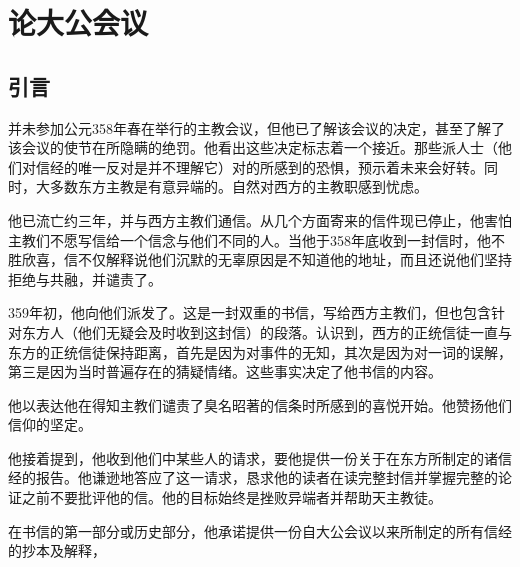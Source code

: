 
\chapter{论大公会议}



\section{引言}

并未参加公元358年春在举行的主教会议，但他已了解该会议的决定，甚至了解了该会议的使节在所隐瞒的绝罚。他看出这些决定标志着一个接近。那些派人士（他们对信经的唯一反对是并不理解它）对的所感到的恐惧，预示着未来会好转。同时，大多数东方主教是有意异端的。自然对西方的主教职感到忧虑。\par

他已流亡约三年，并与西方主教们通信。从几个方面寄来的信件现已停止，他害怕主教们不愿写信给一个信念与他们不同的人。当他于358年底收到一封信时，他不胜欣喜，信不仅解释说他们沉默的无辜原因是不知道他的地址，而且还说他们坚持拒绝与共融，并谴责了。\par

359年初，他向他们派发了。这是一封双重的书信，写给西方主教们，但也包含针对东方人（他们无疑会及时收到这封信）的段落。认识到，西方的正统信徒一直与东方的正统信徒保持距离，首先是因为对事件的无知，其次是因为对一词的误解，第三是因为当时普遍存在的猜疑情绪。这些事实决定了他书信的内容。\par

他以表达他在得知主教们谴责了臭名昭著的信条时所感到的喜悦开始。他赞扬他们信仰的坚定。\par

他接着提到，他收到他们中某些人的请求，要他提供一份关于在东方所制定的诸信经的报告。他谦逊地答应了这一请求，恳求他的读者在读完整封信并掌握完整的论证之前不要批评他的信。他的目标始终是挫败异端者并帮助天主教徒。\par

在书信的第一部分或历史部分，他承诺提供一份自大公会议以来所制定的所有信经的抄本及解释，\par


